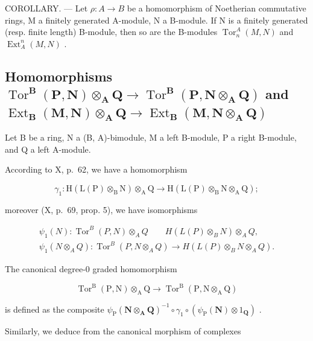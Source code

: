 COROLLARY. --- Let \(\rho: A \to B\) be a homomorphism of Noetherian commutative rings, M a finitely generated A-module, N a B-module. If N is a finitely generated (resp. finite length) B-module, then so are the B-modules \(\operatorname{Tor}_{n}^{A}(M, N)\) and \(\operatorname{Ext}_{A}^{n}(M, N)\) .

\subsection{\texorpdfstring{Homomorphisms \(\operatorname{Tor}^{\mathbf{B}}(\mathbf{P},\mathbf{N})\otimes_{\mathbf{A}}\mathbf{Q}\to \operatorname{Tor}^{\mathbf{B}}(\mathbf{P},\mathbf{N}\otimes_{\mathbf{A}}\mathbf{Q})\) and \(\operatorname{Ext}_{\mathbf{B}}(\mathbf{M},\mathbf{N})\otimes_{\mathbf{A}}\mathbf{Q}\rightarrow \operatorname{Ext}_{\mathbf{B}}(\mathbf{M},\mathbf{N}\otimes_{\mathbf{A}}\mathbf{Q})\)}{Homomorphisms relating Tor and Ext to tensor products}}

Let B be a ring, N a (B, A)-bimodule, M a left B-module, P a right B-module, and Q a left A-module.

According to X, p.~62, we have a homomorphism

\[
\gamma_ {1}: \mathrm{H} (\mathrm{L} (\mathrm{P}) \otimes_ {\mathrm{B}} \mathrm{N}) \otimes_ {\mathrm{A}} \mathrm{Q} \rightarrow \mathrm{H} (\mathrm{L} (\mathrm{P}) \otimes_ {\mathrm{B}} \mathrm{N} \otimes_ {\mathrm{A}} \mathrm{Q});
\]

moreover (X, p.~69, prop. 5), we have isomorphisms

\[
\begin{array}{c} \psi_ {1} (N): \operatorname{Tor} ^ {B} (P, N) \otimes_ {A} Q \qquad H (L (P) \otimes_ {B} N) \otimes_ {A} Q, \\ \psi_ {1} (N \otimes_ {A} Q): \operatorname{Tor} ^ {B} (P, N \otimes_ {A} Q) \to H (L (P) \otimes_ {B} N \otimes_ {A} Q). \end{array}
\]

The canonical degree-0 graded homomorphism

\[
\operatorname{Tor} ^ {\mathrm{B}} (\mathrm{P}, \mathrm{N}) \otimes_ {\mathrm{A}} \mathrm{Q} \rightarrow \operatorname{Tor} ^ {\mathrm{B}} (\mathrm{P}, \mathrm{N} \otimes_ {\mathrm{A}} \mathrm{Q})\tag{9}
\]

is defined as the composite \(\psi_{\mathrm{P}}(\mathbf{N}\otimes_{\mathbf{A}}\mathbf{Q})^{-1}\circ \gamma_{1}\circ (\psi_{\mathrm{P}}(\mathbf{N})\otimes 1_{\mathbf{Q}})\) .

Similarly, we deduce from the canonical morphism of complexes

